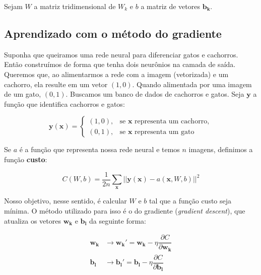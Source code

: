 \documentclass{article}
\begin{document}
            Sejam $W$ a matriz tridimensional de $W_k$ e $b$ a matriz de vetores $\mathbf{b_k}$.

        \subsection{Aprendizado com o método do gradiente}
        
            Suponha que queiramos uma rede neural para diferenciar gatos e cachorros.
            Então construímos de forma que tenha dois neurônios na camada de saída.
            Queremos que, ao alimentarmos a rede com a imagem (vetorizada) e um cachorro, ela resulte em um vetor $(1, 0)$.
            Quando alimentada por uma imagem de um gato, $(0, 1)$.
            Buscamos um banco de dados de cachorros e gatos. Seja $\mathbf{y}$ a função que identifica cachorros e gatos:

            \begin{equation}
                \mathbf{y}(\mathbf{x}) =    \begin{cases}
                                                (1, 0), & \textrm{se } \mathbf{x} \textrm{ representa um cachorro}, \\
                                                (0, 1), & \textrm{se } \mathbf{x} \textrm{ representa um gato}
                                            \end{cases}
            \end{equation}

            Se $a$ é a função que representa nossa rede neural e temos $n$ imagens, definimos a função \textbf{custo}:
            
            \begin{equation}
                C(W, b) = \dfrac{1}{2n} \sum_{\mathbf{x}} ||\mathbf{y}(\mathbf{x}) - a(\mathbf{x}, W, b)||^2
            \end{equation}

            Nosso objetivo, nesse sentido, é calcular $W$ e $b$ tal que a função custo seja mínima.
            O método utilizado para isso é o do gradiente (\textit{gradient descent}), que atualiza os vetores $\mathbf{w_k}$ e $\mathbf{b_l}$ da seguinte forma:

            \begin{equation}
                \begin{split}
                    \mathbf{w_k} &\rightarrow \mathbf{w_k'} = \mathbf{w_k} - \eta \dfrac{\partial C}{\partial \mathbf{w_k}} \\
                    \mathbf{b_l} &\rightarrow \mathbf{b_l'} = \mathbf{b_l} - \eta \dfrac{\partial C}{\partial \mathbf{b_l}}
                \end{split}
            \end{equation}
\end{document}
